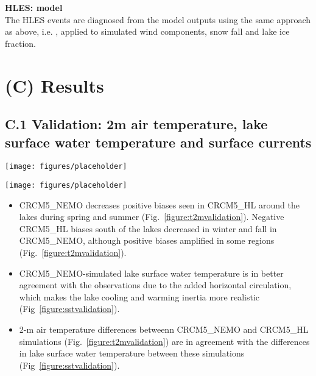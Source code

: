 \documentclass[a0b,landscape]{a0poster}
\begin{document}
\begin{multicols*}{4}
\noindent
\textbf{HLES: model}\\
The HLES events are diagnosed from the model outputs using the same approach as above, i.e. \citet{notaro2015}, applied to simulated wind components, snow fall and lake ice fraction.


\section*{(C) Results}
\subsection*{C.1 Validation: 2m air temperature, lake surface water temperature and surface currents}

\begin{center}
    \texttt{[image: figures/placeholder]}
\end{center}

\begin{center}
    \texttt{[image: figures/placeholder]}
\end{center}

\begin{itemize}
    \item CRCM5\_NEMO decreases positive biases seen in CRCM5\_HL around the lakes during spring and summer (Fig.~\ref{figure:t2mvalidation}).
    Negative CRCM5\_HL biases south of the lakes decreased in winter and fall in CRCM5\_NEMO, although positive biases amplified in some regions (Fig.~\ref{figure:t2mvalidation}).
    \item CRCM5\_NEMO-simulated lake surface water temperature is in better agreement with
          the observations due to the added horizontal circulation, which makes the lake
          cooling and warming inertia more realistic (Fig~\ref{figure:sstvalidation}).
    \item 2-m air temperature differences betweenn CRCM5\_NEMO and
          CRCM5\_HL simulations (Fig.~\ref{figure:t2mvalidation}) are in agreement with the
          differences in lake surface water temperature between these simulations
          (Fig~\ref{figure:sstvalidation}).
\end{itemize}



\end{multicols*}
\end{document}
